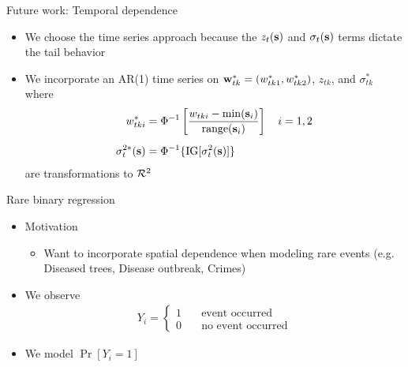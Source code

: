 \documentclass{beamer}
\begin{document}
\begin{frame}{Future work: Temporal dependence}
  \begin{itemize} \setlength{\itemsep}{1em}
    \item We choose the time series approach because the $z_t(\mbox{\bf s})$ and $\sigma_t(\mbox{\bf s})$ terms dictate the tail behavior
    \item We incorporate an AR(1) time series on $\mbox{\bf w}^*_{tk} = (w^*_{tk1}, w^*_{tk2})$, $z_{tk}$, and $\sigma^*_{tk}$ where
    \begin{align*}
      w^*_{tki} &= \Phi^{-1}\left[ \frac{w_{tki} - \min(\mbox{\bf s}_i)}{ \text{range}(\mbox{\bf s}_i)}\right] \quad i = 1, 2 \\[0.5em]
      \sigma^{2*}_t(\mbox{\bf s}) &= \Phi^{-1}\{ \text{IG}[\sigma^2_t(\mbox{\bf s})] \}
    \end{align*}
    are transformations to ${\cal R}^2$
  \end{itemize}
\end{frame}

\begin{frame}{Rare binary regression}
  \begin{itemize} \setlength{\itemsep}{1em}
    \item Motivation \vspace{0.5em}
    \begin{itemize} \setlength{\itemsep}{0.5em}
      \item Want to incorporate spatial dependence when modeling rare events (e.g. Diseased trees, Disease outbreak, Crimes)
    \end{itemize}
    \item We observe
    \begin{align*}
      Y_i = \left\{ \begin{array}{ll}
        1 \quad & \text{event occurred}\\
        0 \quad & \text{no event occurred}
      \end{array} \right.
    \end{align*}
    \item We model $\Pr[Y_i = 1]$
  \end{itemize}
\end{frame}
\end{document}
